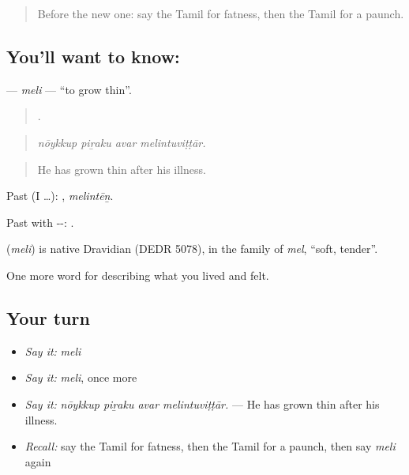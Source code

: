 \label{lesson:TA-C488-meli}



\begin{quote}
Before the new one: say the Tamil for fatness, then the Tamil for a paunch.
\end{quote}

\subsection*{You'll want to know: }
\textbf{} — \emph{meli} — \textquotedblleft{}to grow thin\textquotedblright{}.

\begin{quote}
   .
\end{quote}

\begin{quote}
\emph{nōykkup piṟaku avar melintuviṭṭār.}
\end{quote}

\begin{quote}
He has grown thin after his illness.
\end{quote}

Past (I …): , \emph{melintēṉ}.

Past with --: .

\begin{cousinweb}
\textbf{} (\emph{meli}) is native Dravidian (DEDR 5078), in the family of  \emph{mel}, \textquotedblleft{}soft, tender\textquotedblright{}.
\end{cousinweb}

\begin{grammarlens}[title={What you've built}]
One more word for describing what you lived and felt.
\end{grammarlens}

\subsection*{Your turn}
\begin{itemize}
\raggedright
  \item \emph{Say it:} \emph{meli}
  \item \emph{Say it:} \emph{meli}, once more
  \item \emph{Say it:} \emph{nōykkup piṟaku avar melintuviṭṭār.} — He has grown thin after his illness.
  \item \emph{Recall:} say the Tamil for fatness, then the Tamil for a paunch, then say \emph{meli} again
\end{itemize}

